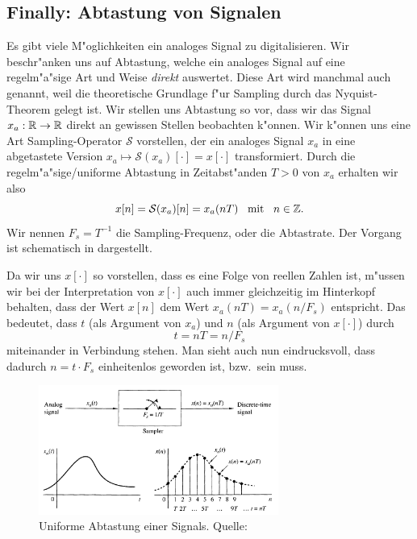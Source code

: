 \subsection{Finally: Abtastung von Signalen}
%
Es gibt viele M"oglichkeiten ein analoges Signal zu digitalisieren.
Wir beschr"anken uns auf Abtastung, welche ein analoges Signal auf eine regelm"a"sige Art und Weise \emph{direkt} auswertet.
Diese Art wird manchmal auch  genannt, weil die theoretische Grundlage f"ur  Sampling durch das Nyquist-Theorem gelegt ist.
Wir stellen uns Abtastung so vor, dass wir das Signal $x_a: \mathbb{R} \rightarrow \mathbb{R}$ direkt an gewissen Stellen beobachten k"onnen.
Wir k"onnen uns eine Art Sampling-Operator $\mathcal{S}$ vorstellen, der ein analoges Signal $x_a$ in eine abgetastete Version $x_a \mapsto \mathcal{S}(x_a)[\cdot] = x[\cdot]$ transformiert.
Durch die regelm"a"sige/uniforme Abtastung in Zeitabst"anden $T > 0$ von $x_a$ erhalten wir also
\[
    x[n] = \mathcal{S}(x_a)[n] = x_a(n T) {\hspace{3mm} \text{mit} \hspace{3mm}} n \in \mathbb{Z}.
\]
Wir nennen $F_s = T^{-1}$ die Sampling-Frequenz, oder die Abtastrate.
Der Vorgang ist schematisch in  dargestellt.

Da wir uns $x[\cdot]$ so vorstellen, dass es  eine Folge von reellen Zahlen ist, m"ussen wir bei der Interpretation von $x[\cdot]$ auch immer gleichzeitig im Hinterkopf behalten, dass der Wert $x[n]$ dem Wert $x_a(n T) = x_a(n/F_s)$ entspricht.
Das bedeutet, dass $t$ (als Argument von $x_a$) und $n$ (als Argument von $x[\cdot]$) durch
\[
t = n T = n/F_s
\]
miteinander in Verbindung stehen. 
Man sieht auch nun eindrucksvoll, dass dadurch $n = t \cdot F_s$ einheitenlos geworden ist, bzw.~sein muss.
%
\begin{figure}
    \begin{center}
        \includegraphics[width=0.7\textwidth]{img/sampling/uniform_sampling.png}
    \end{center}
    \caption{Uniforme Abtastung einer Signals. Quelle: \cite{proakis2013}}\label{fig:uniform_sampling}
\end{figure}


